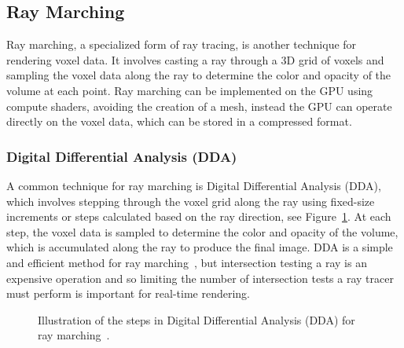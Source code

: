 \documentclass{article}
\begin{document}
\subsection{Ray Marching}
Ray marching, a specialized form of ray tracing, is another technique for rendering voxel data. It involves casting a ray through a 3D grid of voxels and sampling the voxel data along the ray to determine the color and opacity of the volume at each point. Ray marching can be implemented on the GPU using compute shaders, avoiding the creation of a mesh, instead the GPU can operate directly on the voxel data, which can be stored in a compressed format.

\subsubsection{Digital Differential Analysis (DDA)}
A common technique for ray marching is Digital Differential Analysis (DDA), which involves stepping through the voxel grid along the ray using fixed-size increments or steps calculated based on the ray direction, see Figure~\ref{fig:dda}. At each step, the voxel data is sampled to determine the color and opacity of the volume, which is accumulated along the ray to produce the final image. DDA is a simple and efficient method for ray marching~\cite{Amanatides_Woo_1987}, but intersection testing a ray is an expensive operation and so limiting the number of intersection tests a ray tracer must perform is important for real-time rendering.

\begin{figure}[thp]
    \begin{center}
    \end{center}
    \caption{Illustration of the steps in Digital Differential Analysis (DDA) for ray marching~\cite{Xiao_2019}.}
    \label{fig:dda}
\end{figure}
\end{document}
